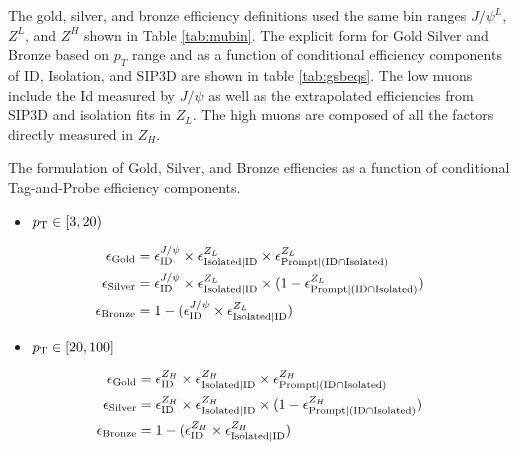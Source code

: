  The gold, silver, and bronze efficiency definitions used the same bin ranges $J/\psi^L$, $Z^L$, and $Z^H$ shown in Table \ref{tab:mubin}. The explicit form for Gold Silver and Bronze based on $p_T$ range and as a function of conditional efficiency components of ID, Isolation, and SIP3D are shown in table \ref{tab:gsbeqs}. The low \pt muons include the Id measured by $J/\psi$ as well as the extrapolated efficiencies from SIP3D and isolation fits in $Z_{L}$. The high \pt muons are composed of all the factors directly measured in $Z_H$.
\begin{table}
\caption{The formulation of Gold, Silver, and Bronze effiencies as a function of conditional Tag-and-Probe efficiency components.} 
\label{tab:gsbeqs}
\begin{itemize}
\item[] $p_{\mathrm{T}} \in [3,20)$
\end{itemize}
\begin{equation}\label{eq:effcomp_J}
\begin{split}
\epsilon_{\text{Gold}}& = \epsilon_{\text{ID}}^{J/\psi}\times \epsilon_{\text{Isolated}|\text{ID}}^{Z_L} \times \epsilon_{\text{Prompt}|(\text{ID} \cap \text{Isolated})}^{Z_L} \\
\epsilon_{\text{Silver}}& = \epsilon_{\text{ID}}^{J/\psi} \times \epsilon_{\text{Isolated}|\text{ID}}^{Z_L} \times (1-\epsilon_{\text{Prompt}|(\text{ID} \cap \text{Isolated})}^{Z_L}) \\
\epsilon_{\text{Bronze}}& = 1-(\epsilon_{\text{ID}}^{J/\psi} \times \epsilon_{\text{Isolated}|\text{ID}}^{Z_L})
\end{split}
\end{equation}
\begin{itemize}
\item[] $p_{\mathrm{T}} \in [20,100 ]$
\end{itemize}
\begin{equation}\label{eq:effcomp_Z}
\begin{split}
\epsilon_{\text{Gold}}& = \epsilon_{\text{ID}}^{Z_H}\times\epsilon_{\text{Isolated}|\text{ID}}^{Z_H}\times\epsilon_{\text{Prompt}|(\text{ID} \cap \text{Isolated})}^{Z_H} \\
\epsilon_{\text{Silver}}& = \epsilon_{\text{ID}}^{Z_H}\times\epsilon_{\text{Isolated}|\text{ID}}^{Z_H}\times(1-\epsilon_{\text{Prompt}|(\text{ID} \cap \text{Isolated})}^{Z_H})\\
\epsilon_{\text{Bronze}}& = 1-(\epsilon_{\text{ID}}^{Z_H} \times \epsilon_{\text{Isolated}|\text{ID}}^{Z_H})
\end{split}
\end{equation}

\end{table}

